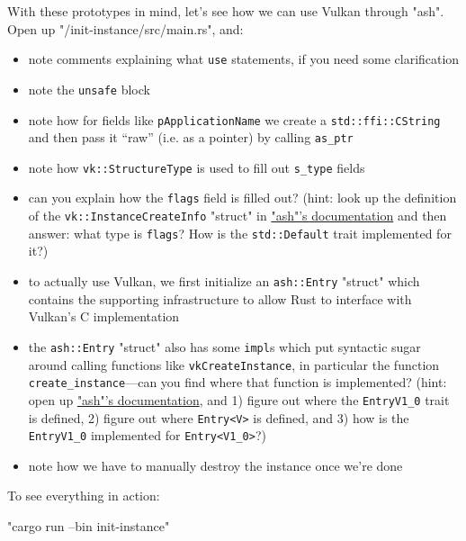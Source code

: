 \documentclass[12pt,letterpaper]{article}
\newcommand{\inquotes}[1]{``#1''}	%
\newcommand{\ril}[1]{\texttt{#1}}
\newcommand{\cil}[1]{\texttt{#1}}
\begin{document}
	With these prototypes in mind, let's see how we can use Vulkan through "ash". Open up "/init-instance/src/main.rs", and:
		\begin{itemize}
			\item note comments explaining what \ril{use} statements, if you need some clarification
			
			\item note the \ril{unsafe} block
			
			\item note how for fields like \cil{pApplicationName} we create a \ril{std::ffi::CString} and then pass it \inquotes{raw} (i.e. as a pointer) by calling \ril{as_ptr}
			
			\item note how \ril{vk::StructureType} is used to fill out \ril{s_type} fields
			
			\item can you explain how the \ril{flags} field is filled out? (hint: look up the definition of the \ril{vk::InstanceCreateInfo} "struct" in \href{https://docs.rs/ash}{"ash"'s documentation} and then answer: what type is \ril{flags}? How is the \ril{std::Default} trait implemented for it?)
			
			\item to actually use Vulkan, we first initialize an \ril{ash::Entry} "struct" which contains the supporting infrastructure to allow Rust to interface with Vulkan's C implementation
			
			\item the \ril{ash::Entry} "struct" also has some \ril{impl}s which put syntactic sugar around calling functions like \ril{vkCreateInstance}, in particular the function \ril{create_instance}---can you find where that function is implemented? (hint: open up \href{https://docs.rs/ash}{"ash"'s documentation}, and 1) figure out where the \ril{EntryV1_0} trait is defined, 2) figure out where \ril{Entry<V>} is defined, and 3) how is the \ril{EntryV1_0} implemented for \ril{Entry<V1_0>}?)
			
			\item note how we have to manually destroy the instance once we're done
		\end{itemize} 
	
	To see everything in action: 
		\begin{center}
			"cargo run --bin init-instance"
		\end{center}
	
\end{document}
